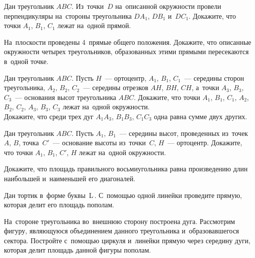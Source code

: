 


\begin{problems}

\item
Дан треугольник $ABC$.
Из~точки~$D$ на~описанной окружности провели перпендикуляры на~стороны
треугольника $D A_1$, $D B_1$ и~$D C_1$.
Докажите, что точки $A_1$, $B_1$, $C_1$ лежат на~одной прямой.

\item
На~плоскости проведены 4~прямые общего положения.
Докажите, что описанные окружности четырех треугольников, образованных этими
прямыми пересекаются в~одной точке.

\item
\subproblem
Дан треугольник $ABC$.
Пусть $H$~--- ортоцентр, $A_1$, $B_1$, $C_1$~--- середины сторон треугольника,
$A_2$, $B_2$, $C_2$~--- середины отрезков $AH$, $BH$, $CH$,
а~точки $A_3$, $B_3$, $C_3$~--- основания высот треугольника $ABC$.
Докажите, что точки
$A_1$, $B_1$, $C_1$, $A_2$, $B_2$, $C_2$, $A_3$, $B_3$, $C_3$ лежат
на~одной окружности.
\\
\subproblem
Докажите, что среди трех дуг $A_1 A_3$, $B_1 B_3$, $C_1 C_3$ одна равна сумме
двух других.

\item
Дан треугольник $ABC$.
Пусть $A_1$, $B_1$~--- середины высот, проведенных из~точек $A$, $B$,
точка~$C'$~--- основание высоты из~точки~$C$, $H$~--- ортоцентр.
Докажите, что точки $A_1$, $B_1$, $C'$, $H$ лежат на~одной окружности.

\item
Докажите, что площадь правильного восьмиугольника равна произведению длин
наибольшей и~наименьшей его диагоналей.

\item
Дан тортик в~форме буквы~\textsf{L}\,.
С~помощью одной линейки проведите прямую, которая
делит его площадь пополам.

\item
На~стороне треугольника во~внешнюю сторону построена дуга.
Рассмотрим фигуру, являющуюся объединением данного треугольника
и~образовавшегося сектора.
Постройте с~помощью циркуля и~линейки прямую через середину дуги, которая
делит площадь данной фигуры пополам.

\end{problems}


